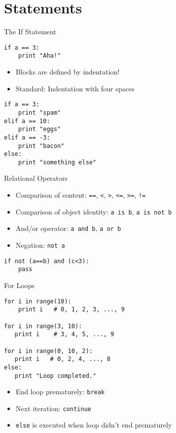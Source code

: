 \section{Statements}

\begin{frame}[fragile]{The If Statement}
\begin{lstlisting}[style=Python]
if a == 3:
    print "Aha!"
\end{lstlisting}
\begin{itemize}
\item Blocks are defined by indentation!
\item Standard: Indentation with four spaces
\end{itemize}
\begin{lstlisting}
if a == 3:
    print "spam"
elif a == 10:
    print "eggs"
elif a == -3:
    print "bacon"
else:
    print "something else"
\end{lstlisting}
\end{frame}

\begin{frame}[fragile]{Relational Operators}
\begin{itemize}
\item Comparison of content: \texttt{==}, \texttt{<}, \texttt{>}, \texttt{<=}, \texttt{>=}, \texttt{!=}
\item Comparison of object identity: \lstinline{a is b}, \lstinline{a is not b}\item And/or operator: \lstinline{a and b}, \lstinline{a or b}
\item Negation: \lstinline{not a}
\end{itemize}
\begin{lstlisting}
if not (a==b) and (c<3):
    pass
\end{lstlisting}
\end{frame}

\begin{frame}[fragile]{For Loops}
\begin{lstlisting}[style=Python]
for i in range(10):
    print i   # 0, 1, 2, 3, ..., 9

for i in range(3, 10):
   print i    # 3, 4, 5, ..., 9

for i in range(0, 10, 2):
   print i   # 0, 2, 4, ..., 8
else:
   print "Loop completed."
\end{lstlisting}
\begin{itemize}
\item End loop prematurely: \lstinline{break}
\item Next iteration: \lstinline{continue}
\item \lstinline{else} is executed when loop didn't end prematurely
\end{itemize}
\end{frame}

